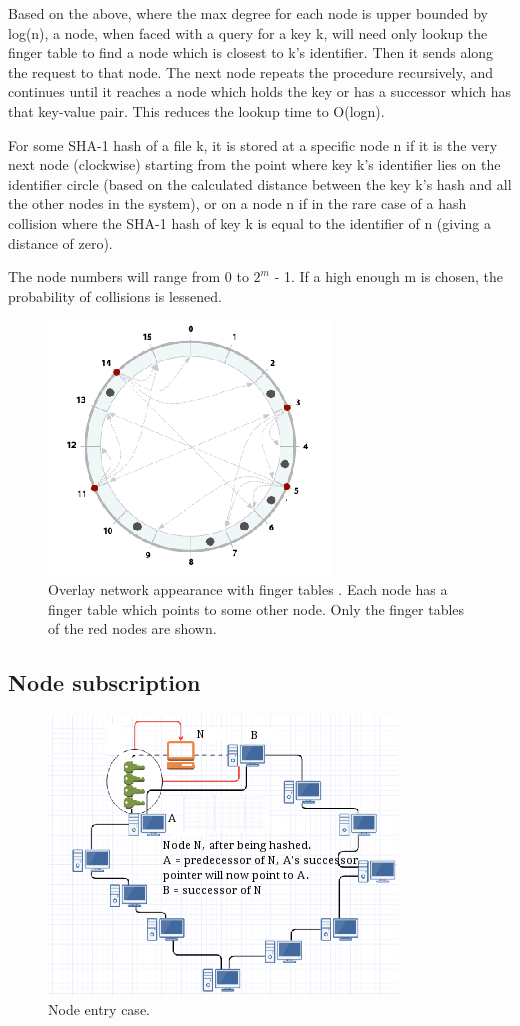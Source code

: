 \documentclass[fleqn,24pt]{SelfArx} %
\begin{document}
Based on the above, where the max degree for each node is upper bounded by log(n), a node, when faced with a query for a key k, will need only lookup the finger table to find a node which is closest to k’s identifier. Then it sends along the request to that node. The next node repeats the procedure recursively, and continues until it reaches a node which holds the key or has a successor which has that key-value pair. This reduces the lookup time to O(logn).

For some SHA-1 hash of a file k, it is stored at a specific node n if it is the very next node (clockwise) starting from the point where key k's identifier lies on the identifier circle (based on the calculated distance between the key k's hash and all the other nodes in the system), or on a node n if in the rare case of a hash collision where the SHA-1 hash of key k is equal to the identifier of n (giving a distance of zero). 

The node numbers will range from 0 to $2^m$ - 1. If a high enough m is chosen, the probability of collisions is lessened.

\begin{figure}[!htb]
\includegraphics{Selection_155.png}
\caption{\label{family}Overlay network appearance with finger tables \cite{1}. Each node has a finger table which points to some other node. Only the finger tables of the red nodes are shown.}
\label{2}
\end{figure}

\subsection{Node subscription}

\begin{figure}[!htb]
\includegraphics{Selection_153.png}
\caption{\label{family}Node entry case.}
\label{3}
\end{figure}
\end{document}

